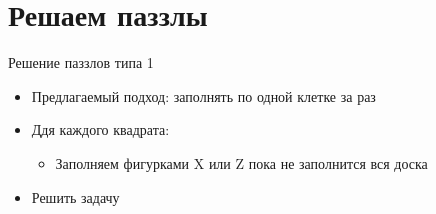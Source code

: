 \documentclass[aspectratio=169
  , xcolor={svgnames}
  , hyperref={ colorlinks,citecolor=DeepPink4
             , linkcolor=DarkRed,urlcolor=DarkBlue}
  , russian
  ]{beamer}
\theoremstyle{exerciseStyle1}
\begin{document}
\section{Решаем паззлы}

\begin{frame}[fragile]{Решение паззлов типа 1}
\begin{itemize}
\item Предлагаемый подход: заполнять по одной клетке за раз
\item Ддя каждого квадрата:
  \begin{itemize}
\item Заполняем фигурками X или Z  пока не заполнится вся доска
\end{itemize}
\item Решить задачу
\end{itemize}
\end{frame}
\end{document}
